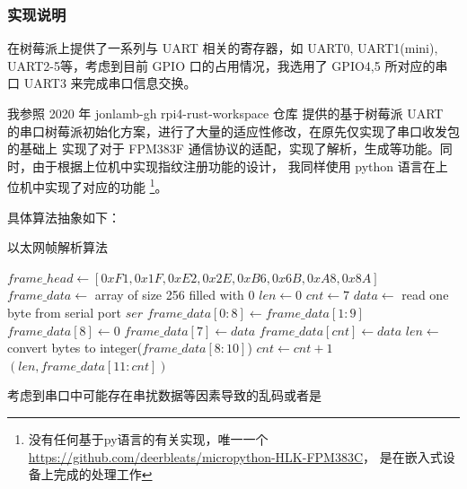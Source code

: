     \subsubsection{实现说明}

    在树莓派上提供了一系列与 UART 相关的寄存器，如 UART0, UART1(mini), 
    UART2-5等，考虑到目前 GPIO 口的占用情况，我选用了 GPIO4,5 所对应的串口
    UART3 来完成串口信息交换。

    我参照 2020 年 jonlamb-gh rpi4-rust-workspace 仓库\cite{rpi4-rust-workspace}
    提供的基于树莓派 UART 的串口树莓派初始化方案，进行了大量的适应性修改，在原先仅实现了串口收发包的基础上
    实现了对于 FPM383F 通信协议的适配，实现了解析，生成等功能。同时，由于根据上位机中实现指纹注册功能的设计，
    我同样使用 python 语言在上位机中实现了对应的功能
    \footnote{没有任何基于py语言的有关实现，唯一一个\href{micropython-HLK-FPM383C}{https://github.com/deerbleats/micropython-HLK-FPM383C}， 是在嵌入式设备上完成的处理工作}。

    具体算法抽象如下：

    \begin{algorithm}[H]
    \caption{以太网帧解析算法}
    \label{algorithm::UART}
    \begin{algorithmic}[1]
        \State $frame\_head \gets [0xF1, 0x1F, 0xE2, 0x2E, 0xB6, 0x6B, 0xA8, 0x8A]$ 
        \State $frame\_data \gets$ array of size 256 filled with 0 
        \State $len \gets 0$
        \State $cnt \gets 7$ 
            \State $data \gets$ read one byte from serial port $ser$ 
                \State $frame\_data[0:8] \gets frame\_data[1:9]$
                \State $frame\_data[8] \gets 0$ 
                \State $frame\_data[7] \gets data$
            \EndIf
                \State $frame\_data[cnt] \gets data$
                    \State $len \gets$ convert bytes to integer($frame\_data[8:10]$)
                \EndIf
                \State $cnt \gets cnt + 1$
            \EndIf
             
                \State \Return $(len, frame\_data[11:cnt])$ 
            \EndIf
        \EndWhile
    \EndFunction
    \end{algorithmic}
    \end{algorithm}
    
    考虑到串口中可能存在串扰数据等因素导致的乱码或者是    

